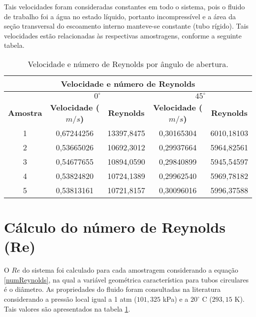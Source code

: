 Tais velocidades foram consideradas constantes em todo o sistema, pois o fluido
de trabalho foi a água no estado líquido, portanto incompressível e a área da
seção transversal do escoamento interno manteve-se constante (tubo rígido). Tais
velocidades estão relacionadas às respectivas amostragens, conforme a seguinte
tabela.

\begin{table}[H]
\centering
\caption{Velocidade e número de Reynolds por ângulo de abertura.}
\label{t:Reynolds}
\begin{tabular}{|c|c|c|c|c|}
\hline
\multicolumn{5}{|c|}{\textbf{Velocidade e  número de Reynolds}}                                                      \\ \hline
\textbf{}        & \multicolumn{2}{c|}{\textbf{$0^\circ$}}         & \multicolumn{2}{c|}{\textbf{$45^\circ$}}        \\ \hline
\textbf{Amostra} & \textbf{Velocidade ($m/s$)} & \textbf{Reynolds} & \textbf{Velocidade ($m/s$)} & \textbf{Reynolds} \\ \hline
1                & 0,67244256                  & 13397,8475        & 0,30165304                  & 6010,18103        \\ \hline
2                & 0,53665026                  & 10692,3012        & 0,29937664                  & 5964,82561        \\ \hline
3                & 0,54677655                  & 10894,0590        & 0,29840899                  & 5945,54597        \\ \hline
4                & 0,53824820                  & 10724,1389        & 0,29962540                  & 5969,78182        \\ \hline
5                & 0,53813161                  & 10721,8157        & 0,30096016                  & 5996,37588        \\ \hline
\end{tabular}
\end{table}

\section{Cálculo do número de Reynolds (Re)}
\label{sec:Reynolds}

O $Re$ do sistema foi calculado para cada amostragem considerando a equação
\eqref{numReynolds}, na qual a variável geométrica característica para tubos
circulares é o diâmetro. As propriedades do fluido foram consultadas na
literatura considerando a pressão local igual a 1 atm ($101,325$ kPa) e a
$20^\circ$ C ($293,15$ K). Tais valores são apresentados na tabela
\ref{t:Reynolds}.

